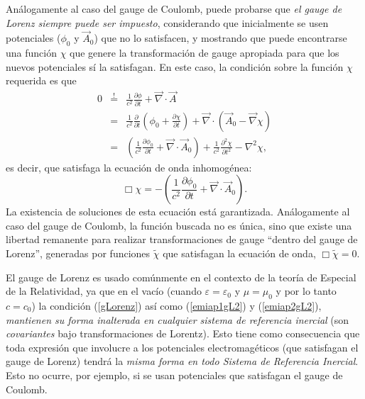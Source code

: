 Análogamente al caso del gauge de Coulomb, puede probarse que \textit{el gauge de Lorenz siempre puede ser impuesto}, considerando que inicialmente se usen potenciales ($\phi_0$ y $\vec{A}_0$) que no lo satisfacen, y mostrando que puede encontrarse una función $\chi$ que genere la transformación de gauge apropiada para que los nuevos potenciales sí la satisfagan. En este caso, la condición sobre la función $\chi$ requerida es que
\begin{eqnarray}
0&\stackrel{!}{=}&\frac{1}{c^2}\frac{\partial\phi}{\partial t}+\vec{\nabla}\cdot\vec{A} \\
&=&\frac{1}{c^2}\frac{\partial\ }{\partial t}\left(\phi_0+\frac{\partial\chi}{\partial t}\right)+\vec{\nabla}\cdot\left(\vec{A}_0-\vec\nabla\chi\right) \\
&=&\left(\frac{1}{c^2}\frac{\partial\phi_0}{\partial t} +\vec{\nabla}\cdot\vec{A}_0\right) +\frac{1}{c^2}\frac{\partial^2\chi }{\partial t^2}-\nabla^2\chi,
\end{eqnarray}
es decir, que satisfaga la ecuación de onda inhomogénea:
\begin{equation}
\Box\chi=-\left(\frac{1}{c^2}\frac{\partial\phi_0}{\partial t} +\vec{\nabla}\cdot\vec{A}_0\right).
\end{equation}
La existencia de soluciones de esta ecuación está garantizada. Análogamente al caso del gauge de Coulomb, la función buscada no es única, sino que existe una libertad remanente para realizar transformaciones de gauge ``dentro del gauge de Lorenz'', generadas por funciones $\tilde\chi$ que satisfagan la ecuación de onda, $\Box\tilde\chi=0$. 

El gauge de Lorenz es usado comúnmente en el contexto de la teoría de Especial de la Relatividad, ya que en el vacío (cuando $\varepsilon=\varepsilon_0$ y $\mu=\mu_0$ y por lo tanto $c=c_0$) la condición (\ref{gLorenz}) así como (\ref{emiap1gL2}) y (\ref{emiap2gL2}), \textit{mantienen su forma inalterada en cualquier sistema de referencia inercial} (son \textit{covariantes} bajo transformaciones de Lorentz). Esto tiene como consecuencia que toda expresión que involucre a los potenciales electromagéticos (que satisfagan el gauge de Lorenz) tendrá la \textit{misma forma en todo Sistema de Referencia Inercial}. Esto no ocurre, por ejemplo, si se usan potenciales que satisfagan el gauge de Coulomb.

